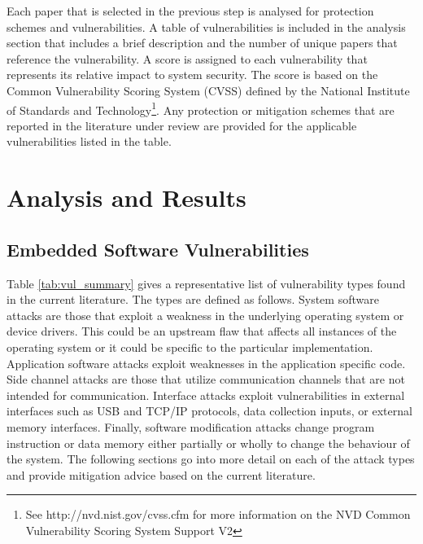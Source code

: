 \documentclass[final,conference,10pt]{IEEEtran}
\begin{document}
Each paper that is selected in the previous step is analysed for protection schemes and vulnerabilities.  A table of vulnerabilities is included in the analysis section that includes a brief description and the number of unique papers that reference the vulnerability. A score is assigned to each vulnerability that represents its relative impact to system security. The score is based on the Common Vulnerability Scoring System (CVSS) defined by the National Institute of Standards and Technology\footnote{See http://nvd.nist.gov/cvss.cfm for more information on the NVD Common Vulnerability Scoring System Support V2}.  Any protection or mitigation schemes that are reported in the literature under review are provided for the applicable vulnerabilities listed in the table.  

\section{Analysis and Results}

\subsection{Embedded Software Vulnerabilities}

Table \ref{tab:vul_summary} gives a representative list of vulnerability types found in the current literature.  The types are defined as follows.  System software attacks are those that exploit a weakness in the underlying operating system or device drivers.  This could be an upstream flaw that affects all instances of the operating system or it could be specific to the particular implementation. Application software attacks exploit weaknesses in the application specific code.  Side channel attacks are those that utilize communication channels that are not intended for communication.  Interface attacks exploit vulnerabilities in external interfaces such as USB and TCP/IP protocols, data collection inputs, or external memory interfaces.  Finally, software modification attacks change program instruction or data memory either partially or wholly to change the behaviour of the system.  The following sections go into more detail on each of the attack types and provide mitigation advice based on the current literature.
\end{document}

